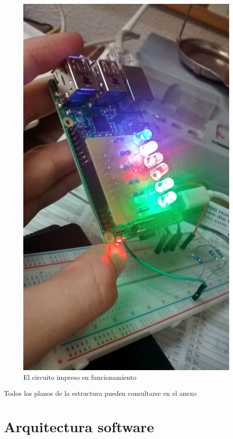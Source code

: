 \begin{figure}[H]
\includegraphics[height=0.255\textheight]{Chapters/Chapter5/Figures/estructuraFinal/pcb9}
\caption{El circuito impreso en funcionamiento}
\end{figure}


Todos los planos de la estructura pueden consultarse en el anexo \citationneeded[TODO]

\section{Arquitectura software}

